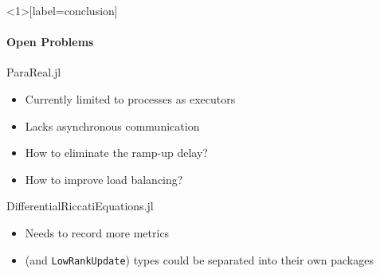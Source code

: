 \begin{frame}<1>[label=conclusion]{\secname}
\framesubtitle{Open Problems}
\begin{block}{ParaReal.jl}
  \begin{itemize}
    \item
      Currently limited to processes as executors
    \item
      Lacks asynchronous communication
    \item
      How to eliminate the ramp-up delay?

    \item
      How to improve load balancing?

  \end{itemize}
\end{block}
\begin{block}{DifferentialRiccatiEquations.jl}
  \begin{itemize}
    \item
      Needs to record more metrics
    \item
      \texttt{\LDLt} (and \texttt{LowRankUpdate}) types could be separated into their own packages
  \end{itemize}
\end{block}
\end{frame}

